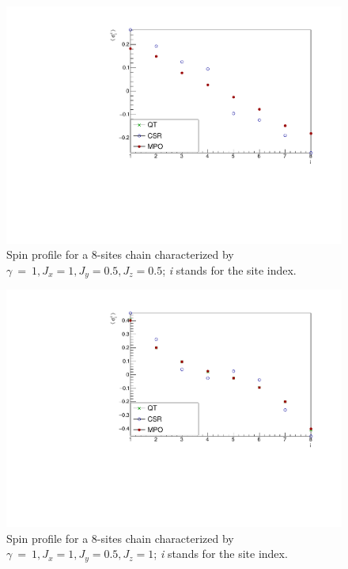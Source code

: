 \begin{figure}[H]
    \centering
    \includegraphics[scale=0.7]{Figures/8sites/LMComparison_8sJ10505.pdf}
    \caption{Spin profile for a 8-sites chain characterized by $\gamma~=~1, J_x=1, J_y=0.5, J_z=0.5$; \emph{i} stands for the site index.}
    \label{fig:8sites_LMcomparisonJz05}
\end{figure}

\begin{figure}[H]
    \centering
    \includegraphics[scale=0.7]{Figures/8sites/LMComparison_8sJ1051.pdf}
    \caption{Spin profile for a 8-sites chain characterized by $\gamma~=~1, J_x=1, J_y=0.5, J_z=1$; \emph{i} stands for the site index.}
    \label{fig:8sites_LMcomparisonJz1}
\end{figure}

